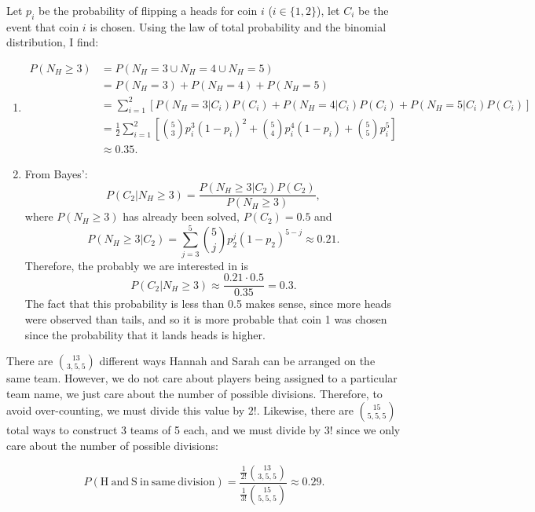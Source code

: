 \begin{problem}{13} Let $p_i$ be the probability of flipping a heads for coin $i$ ($i \in \{1, 2\}$), let $C_i$ be the event that coin $i$ is chosen.  Using the law of total probability and the binomial distribution, I find:

	\begin{enumerate}
		\item 
		\begin{align*}
			P(N_H \ge 3) &= P(N_H=3 \cup N_H=4 \cup N_H=5) \\
			& = P(N_H=3)+P(N_H=4)+P(N_H=5) \\
			& = \sum_{i=1}^2 \left[P(N_H=3|C_i)P(C_i)+P(N_H=4|C_i)P(C_i)+P(N_H=5|C_i)P(C_i)\right] \\
			& = \frac{1}{2} \sum_{i=1}^2 \left[\binom{5}{3} p_i^3(1-p_i)^2+ \binom{5}{4} p_i^4(1-p_i)+ \binom{5}{5} p_i^5 \right] \\
			& \approx 0.35.
		\end{align*}
		
		\item From Bayes':
		\begin{equation*}
			P(C_2|N_H \ge 3) =\frac{P(N_H \ge 3|C_2)P(C_2)}{P(N_H \ge 3) },
		\end{equation*}
		where $P(N_H \ge 3)$ has already been solved, $P(C_2)=0.5$ and
		\begin{equation*}
			P(N_H \ge 3|C_2) =  \sum_{j=3}^5 \binom{5}{j}p_2^j(1-p_2)^{5-j} \approx 0.21.
		\end{equation*}
		Therefore, the probably we are interested in is
		\begin{equation*}
			P(C_2|N_H \ge 3) \approx \frac{0.21 \cdot 0.5}{0.35} = 0.3.
		\end{equation*}
The fact that this probability is less than 0.5 makes sense, since more heads were observed than tails, and so it is more probable that coin 1 was chosen since the probability that it lands heads is higher.
	\end{enumerate}

\end{problem}

\begin{problem}{14}
There are $\binom{13}{3, 5, 5}$ different ways Hannah and Sarah can be arranged on the same team.  However, we do not care about players being assigned to a particular team name, we just care about the number of possible divisions.  Therefore, to avoid over-counting, we must divide this value by $2!$.  Likewise, there are $\binom{15}{5, 5, 5}$ total ways to construct 3 teams of 5 each, and we must divide by $3!$ since we only care about the number of possible divisions:

\begin{equation*}
P(\mathrm{H~and~S~in~same~division}) = \frac{\frac{1}{2!}\binom{13}{3, 5, 5}}{\frac{1}{3!}\binom{15}{5, 5, 5}} \approx 0.29.
\end{equation*}

\end{problem}

